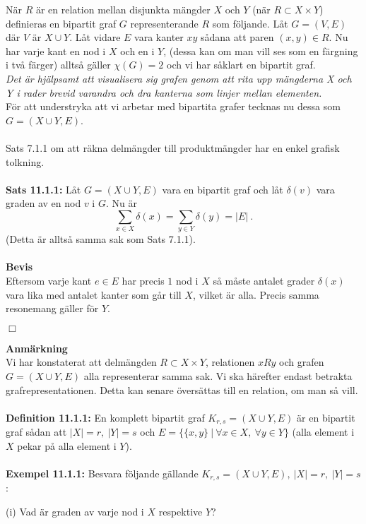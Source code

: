 \documentclass{article}
\begin{document}
När $R$ är en relation mellan disjunkta mängder $X$ och $Y$ (när $R\subset X\times Y$) definieras en bipartit graf $G$ representerande $R$ som följande. Låt $G=(V,E)$ där $V$ är $X\cup Y$. Låt vidare $E$ vara kanter $xy$ sådana att paren $(x,y)\in R$. Nu har varje kant en nod i $X$ och en i $Y$, (dessa kan om man vill ses som en färgning i två färger) alltså gäller $\chi(G)=2$ och vi har såklart en bipartit graf.\\
\textit{Det är hjälpsamt att visualisera sig grafen genom att rita upp mängderna X och Y i rader brevid varandra och dra kanterna som linjer mellan elementen.}\\
För att understryka att vi arbetar med bipartita grafer tecknas nu dessa som $G=(X\cup Y, E)$.\\ \\ 
Sats 7.1.1 om att räkna delmängder till produktmängder har en enkel grafisk tolkning.\\ \\ 
\textbf{Sats 11.1.1:} Låt $G=(X\cup Y,E)$ vara en bipartit graf och låt $\delta(v)$ vara graden av en nod $v$ i $G$. Nu är
$$
\sum_{x\in X}\delta(x)=\sum_{y\in Y}\delta(y)=|E| \ .
$$
(Detta är alltså samma sak som Sats 7.1.1).\\ \\ 
\textbf{Bevis}\\
Eftersom varje kant $e\in E$ har precis $1$ nod i $X$ så måste antalet grader $\delta(x)$ vara lika med antalet kanter som går till $X$, vilket är alla. Precis samma resonemang gäller för $Y$. 
\begin{flushright}
$\Box$
\end{flushright}
\textbf{Anmärkning}\\
Vi har konstaterat att delmängden $R\subset X\times Y$, relationen $xRy$ och grafen $G=(X\cup Y, E)$ alla representerar samma sak. Vi ska härefter endast betrakta grafrepresentationen. Detta kan senare översättas till en relation, om man så vill.\\ \\ 
\textbf{Definition 11.1.1:} En komplett bipartit graf $K_{r,s}=(X\cup Y, E)$ är en bipartit graf sådan att $|X|=r, \ |Y|=s$ och $E=\big\{\{x,y\} \ | \ \forall x\in X, \ \forall y\in Y\big\}$ (alla element i $X$ pekar på alla element i $Y$).\\ \\ 
\textbf{Exempel 11.1.1:} Besvara följande gällande $K_{r,s}=(X\cup Y,E), \ |X|=r, \ |Y|=s$: 

(i) Vad är graden av varje nod i $X$ respektive $Y$? 
\end{document}
